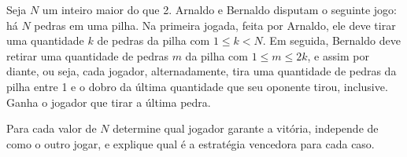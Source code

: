 Seja $N$ um inteiro maior do que 2.
Arnaldo e Bernaldo disputam o seguinte jogo:
há $N$ pedras em uma pilha.
Na primeira jogada, feita por Arnaldo, ele deve tirar uma quantidade $k$ de pedras da pilha com $1 \le k < N$.
Em seguida, Bernaldo deve retirar uma quantidade de pedras $m$ da pilha com $1\le m \le 2k$, e assim por diante, ou seja, cada jogador, alternadamente, tira uma quantidade de pedras da pilha entre 1 e o dobro da última quantidade que seu oponente tirou, inclusive.
Ganha o jogador que tirar a última pedra.

Para cada valor de $N$ determine qual jogador garante a vitória, independe de como o outro jogar, e explique qual é a estratégia vencedora para cada caso.